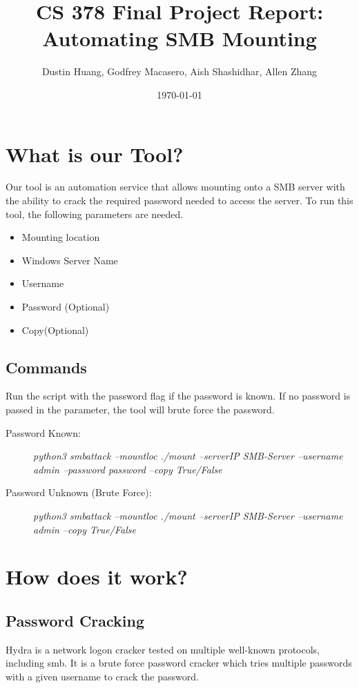 \documentclass[a4paper]{article}
\title{\textbf{CS 378 Final Project Report:
\\{\Large Automating SMB Mounting}}}
\author{Dustin Huang, Godfrey Macasero, Aish Shashidhar, Allen Zhang}
\date{\today}
\begin{document}
\maketitle

\section{What is our Tool?}
\label{sec:introduction}

Our tool is an automation service that allows mounting onto a SMB server with the ability to crack the required password needed to access the server. To run this tool, the following parameters are needed.
\begin{itemize}
\item Mounting location
\item Windows Server Name
\item Username
\item Password (Optional)
\item Copy(Optional)
\end{itemize}

\subsection*{Commands}
Run the script with the password flag if the password is known. If no password is passed in the parameter, the tool will brute force the password.
\begin{description}
\item[Password Known:] \textit{python3 smbattack --mountloc ./mount --serverIP SMB-Server --username admin --password password --copy True/False}
\item[Password Unknown (Brute Force):] \textit{python3 smbattack --mountloc ./mount --serverIP SMB-Server --username admin --copy True/False}
\end{description}

\renewcommand{\thesubsection}{\Alph{subsection}.}

\section{How does it work?}
\subsection{Password Cracking}
Hydra is a network logon cracker tested on multiple well-known protocols, including smb. It is a brute force password cracker which tries multiple passwords with a given username to crack the password.
\end{document}
